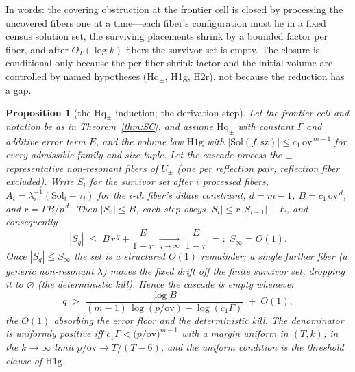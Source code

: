 \documentclass[11pt,a4paper]{article}
\numberwithin{equation}{section}
\theoremstyle{plain}
\theoremstyle{plain}
\newtheorem{proposition}[theorem]{Proposition}
\theoremstyle{definition}
\theoremstyle{remark}
\begin{document}
In words: the covering obstruction at the frontier cell is closed by
processing the uncovered fibers one at a time---each fiber's
configuration must lie in a fixed census solution set, the surviving
placements shrink by a bounded factor per fiber, and after $O_T(\log k)$
fibers the survivor set is empty. The closure is conditional only because
the per-fiber shrink factor and the initial volume are controlled by
named hypotheses (Hq$_\pm$, H1g, H2r), not because the reduction has a
gap.

\begin{proposition}[the Hq$_\pm$-induction; the derivation step]\label{prop:Hq}
Let the frontier cell and notation be as in Theorem~\ref{thm:SC}, and assume
$\mathrm{Hq}_\pm$ with constant $\Gamma$ and additive error term $E$, and the
volume law $\mathrm{H1g}$ with
$|\mathrm{Sol}(f,\mathrm{sz})|\le c_1\,\mathrm{ov}^{\,m-1}$ for every
admissible family and size tuple. Let the cascade process the
$\pm$-representative non-resonant fibers of $U_\pm$ (one per reflection pair,
reflection fiber excluded). Write $S_i$ for the survivor set after $i$
processed fibers, $A_i=\lambda_i^{-1}(\mathrm{Sol}_i-\tau_i)$ for the $i$-th
fiber's dilate constraint, $d=m-1$, $B=c_1\,\mathrm{ov}^{\,d}$, and
$r=\Gamma B/p^{\,d}$. Then $|S_0|\le B$, each step obeys
$|S_i|\le r\,|S_{i-1}|+E$, and consequently
\[
|S_q|\;\le\;B\,r^{\,q}+\frac{E}{1-r}\;\xrightarrow[q\to\infty]{}\;\frac{E}{1-r}
\;=:\;S_\infty=O(1).
\]
Once $|S_q|\le S_\infty$ the set is a structured $O(1)$ remainder; a single
further fiber (a generic non-resonant $\lambda$) moves the fixed drift off
the finite survivor set, dropping it to $\varnothing$ (the deterministic
kill). Hence the cascade is empty whenever
\[
q\;>\;\frac{\log B}{(m-1)\,\log(p/\mathrm{ov})-\log(c_1\Gamma)}\;+\;O(1),
\]
the $O(1)$ absorbing the error floor and the deterministic kill. The
denominator is uniformly positive iff
$c_1\Gamma<\bigl(p/\mathrm{ov}\bigr)^{m-1}$ with a margin uniform in
$(T,k)$; in the $k\to\infty$ limit $p/\mathrm{ov}\to T/(T-6)$, and the
uniform condition is the threshold clause of $\mathrm{H1g}$.
\end{proposition}
\end{document}
